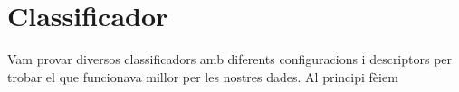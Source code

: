 
\section{Classificador}%
\label{sec:classificador}

Vam provar diversos classificadors amb diferents configuracions i descriptors per trobar el que funcionava millor per
les nostres dades. Al principi fèiem
